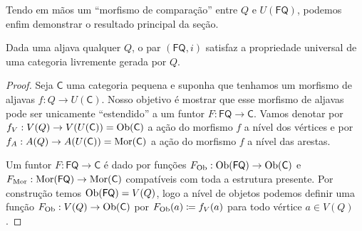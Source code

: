 Tendo em mãos um ``morfismo de comparação'' entre $Q$ e $U(\mathsf{FQ})$, podemos enfim demonstrar o resultado principal da seção.

\begin{teo}
    Dada uma aljava qualquer $Q$, o par $(\mathsf{FQ},i)$ satisfaz a propriedade universal de uma categoria livremente gerada por $Q$.
\end{teo}

\begin{proof}
    Seja $\mathsf{C}$ uma categoria pequena e suponha que tenhamos um morfismo de aljavas $f: Q \to U(\mathsf{C})$.
    Nosso objetivo é mostrar que esse morfismo de aljavas pode ser unicamente ``estendido'' a um funtor $F: \mathsf{FQ} \to \mathsf{C}$.
    Vamos denotar por $f_V: V(Q) \to V(U(\mathsf{C})) = \mathrm{Ob}(\mathsf{C})$ a ação do morfismo $f$ a nível dos vértices e por $f_A: A(Q) \to A(U(\mathsf{C})) = \mathrm{Mor}(\mathsf{C})$ a ação do morfismo $f$ a nível das arestas.

    Um funtor $F: \mathsf{FQ} \to \mathsf{C}$ é dado por funções $F_{\mathrm{Ob}}: \mathrm{Ob}(\mathsf{FQ}) \to \mathrm{Ob}(\mathsf{C})$ e $F_{\mathrm{Mor}}: \mathrm{Mor}(\mathsf{FQ}) \to \mathrm{Mor}(\mathsf{C})$ compatíveis com toda a estrutura presente.
    Por construção temos $\mathrm{Ob}(\mathsf{FQ}) = V(Q)$, logo a nível de objetos podemos definir uma função $F_{\mathrm{Ob}}: V(Q) \to \mathrm{Ob}(\mathsf{C})$ por $F_{\mathrm{Ob}}(a) \coloneqq f_V(a)$ para todo vértice $a \in V(Q)$.


\end{proof}
